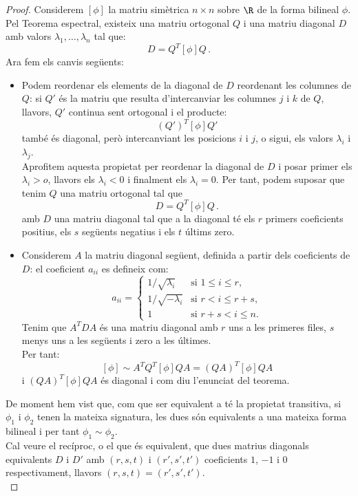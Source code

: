 \begin{proof}
Considerem $[\phi]$ la matriu simètrica $n\times n$ sobre $\R$ de la forma bilineal $\phi$. Pel Teorema espectral, existeix una matriu ortogonal $Q$  i una matriu diagonal $D$ amb valors $\lambda_1, \dots, \lambda_n$ tal que:
\[
D=Q^T [\phi] Q \,.
\]
Ara fem els canvis següents:
\begin{itemize}
    \item Podem reordenar els elements de la diagonal de $D$ reordenant les columnes de $Q$: si $Q'$ és la matriu que resulta d'intercanviar les columnes $j$ i $k$ de $Q$, llavors, $Q'$ continua sent ortogonal i el producte:
    \[
    (Q')^T[\phi]Q'
    \]
    també és diagonal, però intercanviant les posicions $i$ i $j$, o sigui, els valors $\lambda_i$ i $\lambda_j$.\\
    Aprofitem aquesta propietat per reordenar la diagonal de $D$ i posar primer els $\lambda_i>o$, llavors els $\lambda_i<0$ i finalment els $\lambda_i=0$. Per tant, podem suposar que tenim $Q$ una matriu ortogonal tal que
    \[
    D=Q^T [\phi] Q \,.
    \]
    amb $D$ una matriu diagonal tal que a la diagonal té els $r$ primers coeficients positius, els $s$ següents negatius i els $t$ últims zero.
    \item Considerem $A$ la matriu diagonal següent, definida a partir dels coeficients de $D$: el coeficient $a_{ii}$ es defineix com:
    \[
    a_{ii}=\begin{cases}
    1/\sqrt{\lambda_i} & \text{si $1\leq i \leq r$,} \\
    1/\sqrt{-\lambda_i} & \text{si $r < i \leq r+s$,} \\
    1 & \text{si $r+s < i \leq n$.}
    \end{cases}
    \]
    Tenim que $A^TDA$ és una matriu diagonal amb $r$ uns a les primeres files, $s$ menys uns a les següents i zero a les últimes.\\
    Per tant:
    \[
    [\phi] \sim A^TQ^T [\phi] QA = (QA)^T [\phi] QA
    \]
    i $(QA)^T [\phi] QA$ és diagonal i com diu l'enunciat del teorema.
\end{itemize}
De moment hem vist que, com que ser equivalent a té la propietat transitiva, si $\phi_1$ i $\phi_2$ tenen la mateixa signatura, les dues són equivalents a una mateixa forma bilineal i per tant $\phi_1\sim \phi_2$.\\
Cal veure el recíproc, o el que és equivalent, que dues matrius diagonals equivalents $D$ i $D'$ amb $(r,s,t)$ i $(r',s',t')$ coeficients $1$, $-1$ i $0$ respectivament, llavors $(r,s,t)=(r',s',t')$. \\

\end{proof}
